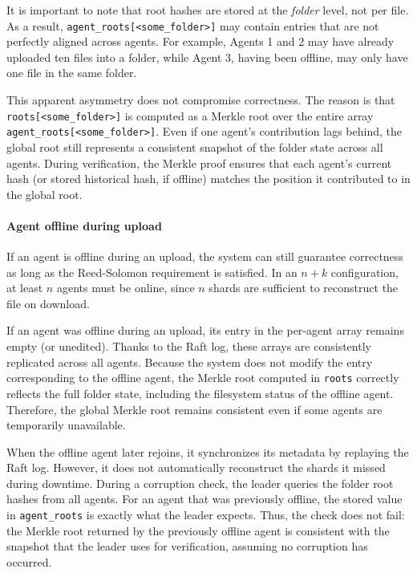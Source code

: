 It is important to note that root hashes are stored at the \emph{folder} level, not per file. As a result, \texttt{agent\_roots[<some\_folder>]} may contain entries that are not perfectly aligned across agents. For example, Agents 1 and 2 may have already uploaded ten files into a folder, while Agent 3, having been offline, may only have one file in the same folder.  

This apparent asymmetry does not compromise correctness. The reason is that \texttt{roots[<some\_folder>]} is computed as a Merkle root over the entire array \texttt{agent\_roots[<some\_folder>]}. Even if one agent's contribution lags behind, the global root still represents a consistent snapshot of the folder state across all agents. During verification, the Merkle proof ensures that each agent's current hash (or stored historical hash, if offline) matches the position it contributed to in the global root.  

\paragraph{Agent offline during upload}

If an agent is offline during an upload, the system can still guarantee correctness as long as the Reed-Solomon requirement is satisfied. In an $n+k$ configuration, at least $n$ agents must be online, since $n$ shards are sufficient to reconstruct the file on download.

If an agent was offline during an upload, its entry in the per-agent array remains empty (or unedited). Thanks to the Raft log, these arrays are consistently replicated across all agents. Because the system does not modify the entry corresponding to the offline agent, the Merkle root computed in \texttt{roots} correctly reflects the full folder state, including the filesystem status of the offline agent. Therefore, the global Merkle root remains consistent even if some agents are temporarily unavailable.

When the offline agent later rejoins, it synchronizes its metadata by replaying the Raft log. However, it does not automatically reconstruct the shards it missed during downtime. During a corruption check, the leader queries the folder root hashes from all agents. For an agent that was previously offline, the stored value in \texttt{agent\_roots} is exactly what the leader expects. Thus, the check does not fail: the Merkle root returned by the previously offline agent is consistent with the snapshot that the leader uses for verification, assuming no corruption has occurred.

